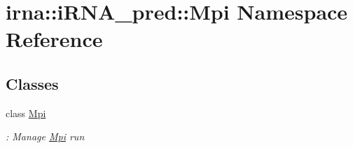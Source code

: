 \hypertarget{namespaceirna_1_1iRNA__pred_1_1Mpi}{
\section{irna\-:\-:i\-R\-N\-A\-\_\-pred\-:\-:\-Mpi \-Namespace \-Reference}
\label{namespaceirna_1_1iRNA__pred_1_1Mpi}
}
\subsection*{\-Classes}
\begin{DoxyCompactItemize}
\item 
class \hyperlink{classirna_1_1iRNA__pred_1_1Mpi_1_1Mpi}{\-Mpi}
\begin{DoxyCompactList}\small\item\em \-: \-Manage \hyperlink{classirna_1_1iRNA__pred_1_1Mpi_1_1Mpi}{\-Mpi} run \end{DoxyCompactList}\end{DoxyCompactItemize}
